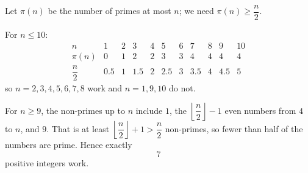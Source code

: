 Let $\pi(n)$ be the number of primes at most $n$; we need $\pi(n)\ge\dfrac {n}{2}$.

For $n\le 10$:
\[
\begin{array}{c|cccccccccc}
n & 1 & 2 & 3 & 4 & 5 & 6 & 7 & 8 & 9 & 10\\\hline
\pi(n) & 0 & 1 & 2 & 2 & 3 & 3 & 4 & 4 & 4 & 4\\
\dfrac {n}{2} & 0.5 & 1 & 1.5 & 2 & 2.5 & 3 & 3.5 & 4 & 4.5 & 5
\end{array}
\]
so $n=2,3,4,5,6,7,8$ work and $n=1,9,10$ do not.

For $n\ge9$, the non-primes up to $n$ include $1$, the $\left\lfloor\dfrac {n}{2}\right\rfloor-1$ even numbers from $4$ to $n$, and $9$. That is at least $\left\lfloor\dfrac {n}{2}\right\rfloor+1>\dfrac {n}{2}$ non-primes, so fewer than half of the numbers are prime. Hence exactly
\[\boxed{7}\]
positive integers work.
